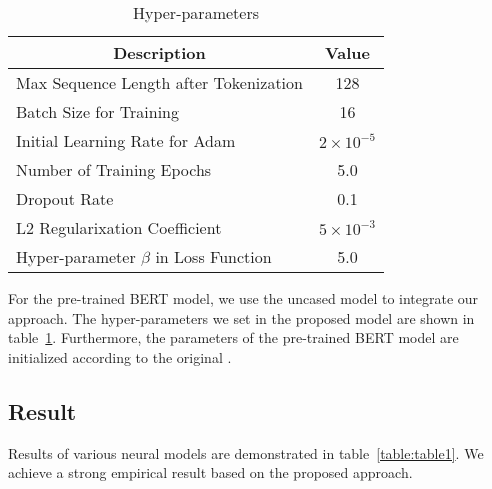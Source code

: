 \documentclass[conference]{IEEEtran}
\begin{document}
\begin{table}[ht]
\renewcommand\arraystretch{1.5}
\caption{Hyper-parameters}
\begin{center}
\begin{tabular}{|l|c|}
\hline
\multicolumn{1}{|c|}{\textbf{Description}} &\multicolumn{1}{|c|}{\textbf {Value} }\\ \hline
Max Sequence Length after Tokenization & 128   \\ \hline
Batch Size for Training & 16    \\ \hline 
Initial Learning Rate for Adam                   & \begin{math} 2 \times 10^{-5} \end{math}  \\ \hline
Number of Training Epochs       & 5.0    \\ \hline
Dropout Rate     & 0.1    \\ \hline
L2 Regularixation Coefficient    & \begin{math} 5 \times 10^{-3} \end{math}  \\ \hline
Hyper-parameter \begin{math} \beta \end{math} in Loss Function &5.0\\ \hline
\end{tabular}
\label{table:table0}
\end{center}
\end{table}

For the pre-trained BERT model, we use the uncased model to integrate our approach. The hyper-parameters we set in the proposed model are shown in table~\ref{table:table0}. Furthermore, the parameters of the pre-trained BERT model are initialized according to the original \cite{devlin2019bert}.

\subsection{Result}

Results of various neural models are demonstrated in table~\ref{table:table1}. We achieve a strong empirical result based on the proposed approach.
\end{document}
